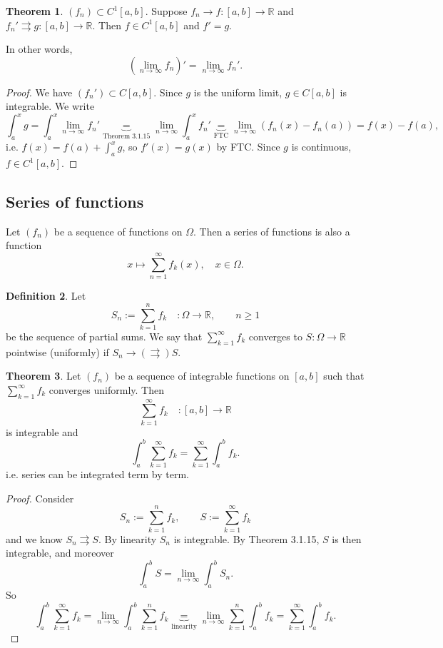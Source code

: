 \documentclass[a4paper]{article}
\theoremstyle{definition}
\newtheorem{defn}{Definition}[subsection]
\newtheorem{thm}[defn]{Theorem}
\begin{document}
\begin{thm}
$(f_n)\subset C^1 [a,b]$. Suppose $f_n \longrightarrow f:[a,b]\rightarrow \mathbb R$ and $f_n' \rightrightarrows g:[a,b]\rightarrow \mathbb R$. Then $f \in C^1 [a,b]$ and $f'=g$.

In other words,
\[
\left(\lim_{n\rightarrow \infty} f_n \right)' = \lim_{n\rightarrow \infty} f_n' .
\]
\end{thm}
\begin{proof}
We have $(f_n') \subset C[a,b]$. Since $g$ is the uniform limit, $g\in C[a,b]$ is integrable. We write
\[
\int_a^x g = \int_a^x \lim_{n\rightarrow \infty} f_n' \underbrace{=}_{\text{Theorem 3.1.15}} \lim_{n\rightarrow \infty} \int_a^x f_n' \underbrace{=}_{\text{FTC}} \lim_{n\rightarrow \infty} \left(f_n(x)-f_n(a)\right) = f(x)-f(a),
\]
i.e. $f(x)=f(a)+\int_a^x g$, so $f'(x)=g(x)$ by FTC. Since $g$ is continuous, $f\in C^1[a,b]$.
\end{proof}

\subsection{Series of functions}
Let $(f_n)$ be a sequence of functions on $\Omega$. Then a series of functions is also a function
\[
x\mapsto \sum_{n=1}^\infty f_k (x),\quad x\in \Omega .
\]
\begin{defn}
Let
\[
S_n := \sum_{k=1}^n f_k\quad :\Omega \rightarrow \mathbb R,\qquad n\geq 1
\]
be the sequence of partial sums. We say that $\displaystyle \sum_{k=1}^\infty f_k$ converges to $S:\Omega \rightarrow \mathbb R$ pointwise (uniformly) if $S_n\rightarrow (\rightrightarrows) S$.
\end{defn}

\begin{thm}
Let $(f_n)$ be a sequence of integrable functions on $[a,b]$ such that $\displaystyle \sum_{k=1}^\infty f_k$ converges uniformly. Then
\[
\sum_{k=1}^\infty f_k\quad :[a,b]\rightarrow \mathbb R
\]
is integrable and
\[
\int_a^b \sum_{k=1}^\infty f_k = \sum_{k=1}^\infty \int_a^b f_k .
\]
i.e. series can be integrated term by term.
\end{thm}
\begin{proof}
Consider
\[
S_n := \sum_{k=1}^n f_k,\qquad S:=\sum_{k=1}^\infty f_k
\]
and we know $S_n \rightrightarrows S$. By linearity $S_n$ is integrable. By Theorem 3.1.15, $S$ is then integrable, and moreover
\[
\int_a^b S = \lim_{n\rightarrow \infty}\int_a^b S_n .
\]
So
\[
\int_a^b \sum_{k=1}^\infty f_k = \lim_{n\rightarrow \infty} \int_a^b \sum_{k=1}^n f_k \underbrace{=}_{\text{linearity}} \lim_{n\rightarrow \infty} \sum_{k=1}^n \int_a^b f_k = \sum_{k=1}^\infty \int_a^b f_k .
\]
\end{proof}
\end{document}
